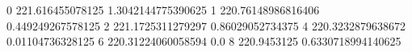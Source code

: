 0 221.616455078125 1.3042144775390625
1 220.76148986816406 0.449249267578125
2 221.1725311279297 0.86029052734375
4 220.3232879638672 0.01104736328125
6 220.31224060058594 0.0
8 220.9453125 0.6330718994140625
